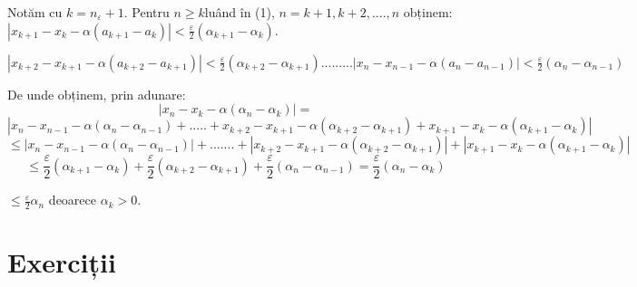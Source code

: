 \documentclass[a4paper,12pt,oneside]{report}
\begin{document}
Notăm cu \(k=n_{\varepsilon }+1\). Pentru \(n\geq k \)luând în (1), \(n= k+1, k+2,....,n\) obținem:
\(\left | x_{k+1} - x_{k} - \alpha \left ( a_{k+1}- a_{k} \right ) \right |< \frac{\varepsilon }{2}\left ( \alpha _{k+1} - \alpha _{k} \right )\). 

\(\left | x_{k+2} - x_{k+1} - \alpha \left ( a_{k+2}- a_{k+1} \right ) \right |< \frac{\varepsilon }{2}\left ( \alpha _{k+2} - \alpha _{k+1} \right )
...
...
...
\left | x_{n} - x_{n-1} - \alpha \left ( a_{n}- a_{n-1} \right ) \right |< \frac{\varepsilon }{2}\left ( \alpha _{n} - \alpha _{n-1} \right )\)

De unde obținem, prin adunare:
\begin{displaymath}
  \left | x_{n} - x_{k} - \alpha \left ( \alpha _{n}-\alpha _{k} \right ) \right |= 
\end{displaymath}
\begin{displaymath}
  \left | x_{n} - x_{n-1} -\alpha \left ( \alpha _{n}-\alpha _{n-1} \right )+.....+x_{k+2}-x_{k+1}-\alpha \left ( \alpha _{k+2}-\alpha _{k+1} \right )  +x_{k+1}-x_{k}-\alpha \left ( \alpha _{k+1}-\alpha _{k} \right )\right |
\end{displaymath}
\begin{displaymath}
  \leq \left | x_{n}-x_{n-1}-\alpha \left ( \alpha _{n}-\alpha _{n-1} \right ) \right |+.......+\left | x_{k+2}-x_{k+1}-\alpha \left ( \alpha _{k+2}-\alpha _{k+1} \right ) \right |+\left | x_{k+1}-x_{k}- \alpha \left ( \alpha _{k+1}-\alpha _{k} \right ) \right |
\end{displaymath}
\begin{displaymath}
  \leq \frac{\varepsilon }{2}\left ( \alpha _{k+1} -\alpha _{k} \right )+\frac{\varepsilon }{2}\left ( \alpha _{k+2}-\alpha _{k+1} \right )+\frac{\varepsilon }{2}\left ( \alpha _{n}- \alpha _{n-1}\right )= \frac{\varepsilon }{2}\left ( \alpha _{n}-\alpha _{k} \right )
\end{displaymath}

\(\leq \frac{\varepsilon }{2}\alpha _{n}\) deoarece \(\alpha _{k}> 0\). 


\section{Exerciții}
\end{document}
